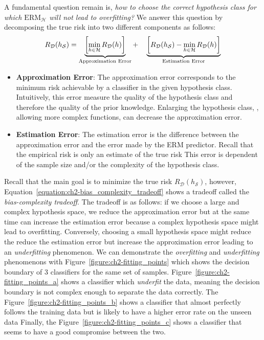 A fundamental question remain is, \emph{how to choose the correct hypothesis class for which $\text{ERM}_\mathcal{H}$ will not lead to overfitting?} 
We answer this question by decomposing the true risk into two different components as follows: 
\begin{equation}
  R_\mathcal{D} (h_\mathcal{S}) = 
  \underbrace{\left[ \min_{h \in \mathcal{H}} R_\mathcal{D}(h) \right]}_{\text{\scriptsize Approximation Error}} + \quad 
  \underbrace{\left[ R_\mathcal{D}(h_\mathcal{S}) - \min_{h \in \mathcal{H}} R_\mathcal{D}(h) \right]}_{\text{\scriptsize Estimation Error}} 
  \label{equation:ch2-bias_complexity_tradeoff}
\end{equation}
\begin{itemize}
  \item \textbf{Approximation Error}: The approximation error corresponds to the minimum risk achievable by a classifier in the given hypothesis class.
  Intuitively, this error measure the quality of the hypothesis class and therefore the quality of the prior knowledge.
  Enlarging the hypothesis class, \ie, allowing more complex functions, can decrease the approximation error.
  \item \textbf{Estimation Error}: The estimation error is the difference between the approximation error and the error made by the ERM predictor.
  Recall that the empirical risk is only an estimate of the true risk
  This error is dependent of the sample size and/or the complexity of the hypothesis class. 
\end{itemize}
Recall that the main goal is to minimize the true risk $R_\mathcal{D} (h_\mathcal{S})$, however, Equation~\ref{equation:ch2-bias_complexity_tradeoff} shows a tradeoff called the \emph{bias-complexity tradeoff}. 
The tradeoff is as follows: if we choose a large and complex hypothesis space, we reduce the approximation error but at the same time can increase the estimation error because a complex hypothesis space might lead to overfitting.
Conversely, choosing a small hypothesis space might reduce the reduce the estimation error but increase the approximation error leading to an \emph{underfitting} phenomenon.
We can demonstrate the \emph{overfitting} and \emph{underfitting} phenomenons with Figure~\ref{figure:ch2-fitting_points} which shows the decision boundary of 3 classifiers for the same set of samples.
Figure~\ref{figure:ch2-fitting_points_a} shows a classifier which \emph{underfit} the data, meaning the decision boundary is not complex enough to separate the data correctly. 
The Figure~\ref{figure:ch2-fitting_points_b} shows a classifier that almost perfectly follows the training data but is likely to have a higher error rate on the unseen data
Finally, the Figure~\ref{figure:ch2-fitting_points_c} shows a classifier that seems to have a good compromise between the two.

